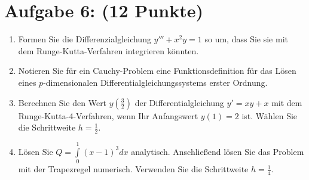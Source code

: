 \documentclass[12pt]{article}
\begin{document}
\pagebreak
\section*{Aufgabe 6: (12 Punkte)}

\begin{enumerate}
	\item Formen Sie die Differenzialgleichung $y''' + x^2y = 1$ so um, dass Sie sie mit dem Runge-Kutta-Verfahren integrieren könnten.
	
	\vspace{2cm}
	
	\item Notieren Sie für ein Cauchy-Problem eine Funktionsdefinition für das Lösen eines $p$-dimensionalen Differentialgleichungssystems erster Ordnung.
	
	\vspace{2cm}
	
	\item Berechnen Sie den Wert $y(\frac{3}{2})$ der Differentialgleichung $y' = xy + x$ mit dem Runge-Kutta-4-Verfahren, wenn Ihr Anfangswert $y(1) = 2$ ist. Wählen Sie die Schrittweite $h = \frac{1}{2}$.
	
	\vspace{7cm}
	
	\item Lösen Sie $Q = \int\limits_0^1 (x-1)^3 dx$ analytisch. Anschließend lösen Sie das Problem mit der Trapezregel numerisch. Verwenden Sie die Schrittweite $h = \frac{1}{4}$.
\end{enumerate}
\end{document}
